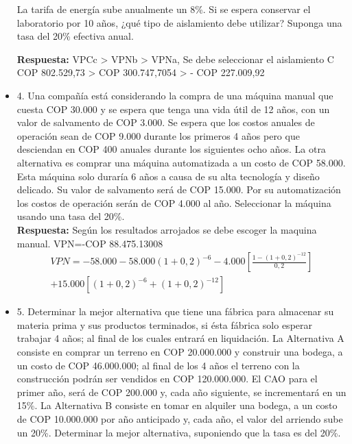 \begin{itemize}
       La tarifa de energía sube anualmente un 8\%. Si se espera conservar el laboratorio por 10 años, ¿qué tipo de aislamiento debe utilizar? Suponga una tasa del 20\% efectiva anual.



       \textbf{Respuesta:} VPCc > VPNb > VPNa, Se debe seleccionar el aislamiento C COP 802.529,73 > COP 300.747,7054 > - COP 227.009,92
       \medskip

 \item 4. Una compañía está considerando la compra de una máquina manual que cuesta COP 30.000 y se espera que tenga una vida útil de 12 años, con un valor de salvamento de COP 3.000. Se espera que los costos anuales de operación sean de COP 9.000 durante los primeros 4 años pero que desciendan en COP 400 anuales durante los siguientes ocho años. La otra alternativa es comprar una máquina automatizada a un costo de COP 58.000. Esta máquina solo duraría 6 años a causa de su alta tecnología y diseño delicado. Su valor de salvamento será de COP 15.000. Por su automatización los costos de operación serán de COP 4.000 al año. Seleccionar la máquina usando una tasa del 20\%.\\

       \textbf{Respuesta:} Según los resultados arrojados se debe escoger la maquina manual. VPN=-COP 88.475.13008
       \begin{align*}
        VPN=-58.000-58.000\left(1+0,2\right)^{-6}-4.000\left[\frac{1-\left(1+0,2\right)^{-12}}{0,2}\right] \\ +15.000\left[\left(1+0,2\right)^{-6}+\left(1+0,2\right)^{-12}\right]
       \end{align*}
       \medskip

 \item 5. Determinar la mejor alternativa que tiene una fábrica para almacenar su materia prima y sus productos terminados, si ésta fábrica solo esperar trabajar 4 años; al final de los cuales entrará en liquidación. La Alternativa A consiste en comprar un terreno en COP 20.000.000 y construir una bodega, a un costo de COP 46.000.000; al final de los 4 años el terreno con la construcción podrán ser vendidos en COP 120.000.000. El CAO para el primer año, será de COP 200.000 y, cada año siguiente, se incrementará en un 15\%. La Alternativa B consiste en tomar en alquiler una bodega, a un costo de COP 10.000.000 por año anticipado y, cada año, el valor del arriendo sube un 20\%. Determinar la mejor alternativa, suponiendo que la tasa es del 20\%. \\


\end{itemize}

